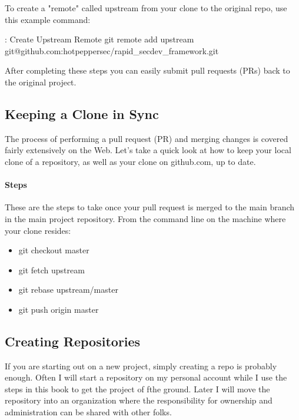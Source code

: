 To create a "remote" called upstream from your clone to the original
repo, use this example command:

\begin{mybox}{\thetcbcounter: Create Upstream Remote}
      git remote add upstream git@github.com:hotpeppersec/rapid\_secdev\_framework.git
\end{mybox}

After completing these steps you can easily submit pull requests (PRs)
back to the original project.

\hypertarget{keeping-a-clone-in-sync}{%
      \subsection{Keeping a Clone in Sync}\label{keeping-a-clone-in-sync}}

\justify
The process of performing a pull request (PR) and merging changes is
covered fairly extensively on the Web. Let's take a quick look at how to
keep your local clone of a repository, as well as your clone on
github.com, up to date.

\hypertarget{steps-1}{%
      \paragraph{Steps}\label{steps-1}}

These are the steps to take once your pull request is merged to the main
branch in the main project repository. From the command line on the
machine where your clone resides:

\begin{itemize}
      \item
            git checkout master
      \item
            git fetch upstream
      \item
            git rebase upstream/master
      \item
            git push origin master
\end{itemize}


\subsection{Creating Repositories}

\justify
If you are starting out on a new project, simply creating a repo is
probably enough. Often I will start a repository on my personal account
while I use the steps in this book to get the project of fthe ground.
Later I will move the repository into an organization where the
responsibility for ownership and administration can be shared with other
folks.

